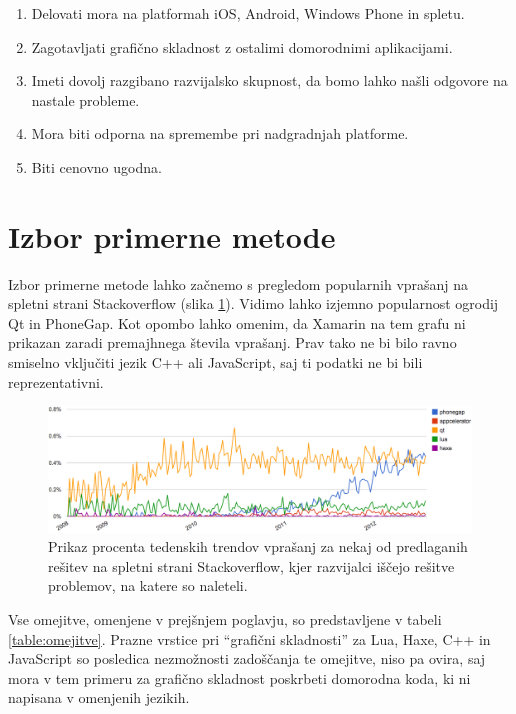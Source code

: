 \begin{enumerate}
  \item Delovati mora na platformah iOS, Android, Windows Phone in spletu.
  \item Zagotavljati grafično skladnost z ostalimi domorodnimi aplikacijami.
  \item Imeti dovolj razgibano razvijalsko skupnost, da bomo lahko našli odgovore na nastale probleme.
  \item Mora biti odporna na spremembe pri nadgradnjah platforme.
  \item Biti cenovno ugodna.
\end{enumerate}

\section{Izbor primerne metode}

Izbor primerne metode lahko začnemo s pregledom popularnih vprašanj na spletni strani Stackoverflow (slika \ref{fig:stackoverflow-trends}). Vidimo lahko izjemno popularnost ogrodij Qt in PhoneGap. Kot opombo lahko omenim, da Xamarin na tem grafu ni prikazan zaradi premajhnega števila vprašanj. Prav tako ne bi bilo ravno smiselno vključiti jezik C++ ali JavaScript, saj ti podatki ne bi bili reprezentativni.

\begin{figure}
 \includegraphics[width=\linewidth]{stackoverflow-trends}
 \caption{Prikaz procenta tedenskih trendov vprašanj za nekaj od predlaganih rešitev na spletni strani Stackoverflow, kjer razvijalci iščejo rešitve problemov, na katere so naleteli.}
 \label{fig:stackoverflow-trends}
\end{figure}

Vse omejitve, omenjene v prejšnjem poglavju, so predstavljene v tabeli \ref{table:omejitve}. Prazne vrstice pri ``grafični skladnosti'' za Lua, Haxe, C++ in JavaScript so posledica nezmožnosti zadoščanja te omejitve, niso pa ovira, saj mora v tem primeru za grafično skladnost poskrbeti domorodna koda, ki ni napisana v omenjenih jezikih.

